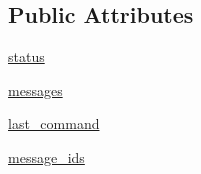 \subsection*{Public Attributes}
\begin{DoxyCompactItemize}
\item 
\hyperlink{classparlai_1_1mturk_1_1core_1_1legacy__2018_1_1agents_1_1AssignState_a256124e49cab161d21001e45e26a391a}{status}
\item 
\hyperlink{classparlai_1_1mturk_1_1core_1_1legacy__2018_1_1agents_1_1AssignState_a41427f6194d8c173f415b119596b479c}{messages}
\item 
\hyperlink{classparlai_1_1mturk_1_1core_1_1legacy__2018_1_1agents_1_1AssignState_a6b14225b614a29376d4d92ba03069780}{last\+\_\+command}
\item 
\hyperlink{classparlai_1_1mturk_1_1core_1_1legacy__2018_1_1agents_1_1AssignState_a00bad7002a4cb6fad145d9b0f79b0ae3}{message\+\_\+ids}
\end{DoxyCompactItemize}
